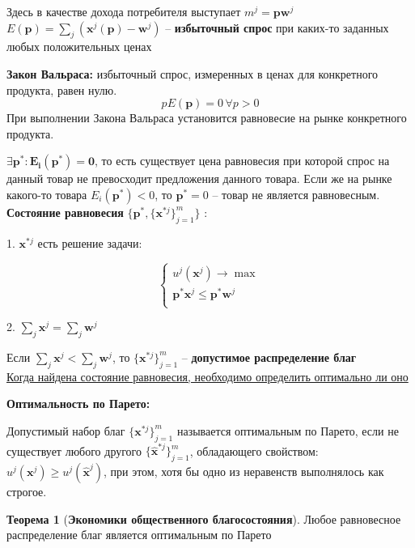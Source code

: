 \documentclass[reqno]{article}
\theoremstyle{definition}
\theoremstyle{definition}
\theoremstyle{definition}
\theoremstyle{definition}
\theoremstyle{definition}
\theoremstyle{definition}
\newtheorem{thm}{Теорема}[section]
\theoremstyle{definition}
\theoremstyle{definition}
\theoremstyle{definition}
\begin{document}
			Здесь в качестве дохода потребителя выступает $m^j = \textbf{pw}^j$ \\
			
			$E(\textbf{p}) = \sum_j(\textbf{x}^j(\textbf{p})-\textbf{w}^j)$ -- \textbf{избыточный спрос} при каких-то заданных любых положительных ценах
		
			\textbf{Закон Вальраса:} избыточный спрос, измеренных в ценах для конкретного продукта, равен нулю.
			$$p E(\textbf{p}) = 0 \, \forall p > 0$$
			При выполнении Закона Вальраса установится равновесие на рынке конкретного продукта. 
			
			$\exists \textbf{p}^* : \boldsymbol{E_i(p^*)=0}$, то есть существует цена равновесия при которой спрос на данный товар не превосходит предложения данного товара. Если же на рынке какого-то товара $E_i(\textbf{p}^*)<0$, то $\textbf{p}^* =0$ -- товар не является равновесным. \\
			
			\textbf{Состояние равновесия } $\{\textbf{p}^*, \{\textbf{x}^{*j}\}_{j=1}^m\}$ :
			
			1. $\textbf{x}^{*j}$ есть решение задачи:
			
			$$
			\begin{cases}
				u^j(\textbf{x}^j) \rightarrow \max \\
				
				\textbf{p}^*\textbf{x}^j \leq \textbf{p}^*\textbf{w}^j \\
			\end{cases}
			$$
			
			2. $\sum_j \textbf{x}^j = \sum_j \textbf{w}^j$ 
			
			Если $\sum_j \textbf{x}^j < \sum_j \textbf{w}^j$, то $\{\textbf{x}^{*j}\}_{j=1}^m$ -- \textbf{допустимое распределение благ} \\
			
			\underline{Когда найдена состояние равновесия, необходимо определить оптимально ли оно}
			
			\textbf{Оптимальность по Парето:}
			
			Допустимый набор благ $\{\textbf{x}^{*j}\}_{j=1}^m$ называется оптимальным по Парето, если не существует любого другого $\{\widehat{\textbf{x}}^{*j}\}_{j=1}^m$, обладающего свойством: $u^j(\textbf{x}^j) \geq u^j(\widehat{\textbf{x}}^j)$, при этом, хотя бы одно из неравенств выполнялось как строгое.
			
			\begin{thm}[\textbf{Экономики общественного благосостояния}]
				Любое равновесное распределение благ является оптимальным по Парето
			\end{thm}
			
\end{document}
